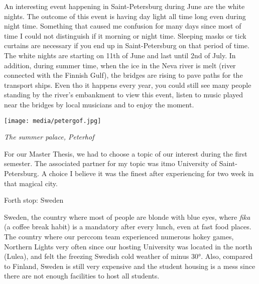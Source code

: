 \documentclass[10pt,a4paper]{article} %
\newcommand{\NewsItem}[1]{ %
\usefont{T1}{fvs}{n}{n} %
\vspace{24pt}\large #1\vspace{3pt} %
\par \normalsize \normalfont}
\begin{document}
\begin{multicols}{3}
 
An interesting event happening in Saint-Petersburg during June are the white nights.
The outcome of this event is having day light all time long even during night 
time. 
Something that caused me confusion for many days since most of time I could not 
distinguish if it morning or night time. 
Sleeping masks or tick curtains are necessary if you end up in Saint-Petersburg 
on that period of time. 
The white nights are starting on 11th of June and last until 2nd of July.
In addition, during summer time, when the ice in the Neva river is melt (river 
connected with the Finnish Gulf), the bridges are rising to pave paths for the 
transport ships. 
Even tho it happens every year, you could still see many people standing by the 
river's embankment to view this event, listen to music played near the bridges by 
local musicians and to enjoy the moment.
 
 
\begin{center}
	\texttt{[image: media/petergof.jpg]}
	\par\textit{The summer palace, Peterhof}
\end{center}


For our Master Thesis, we had to choose a topic of our interest during the first 
semester. 
The associated partner for my topic was {\sc itmo} University of Saint-Petersburg. 
A choice I believe it was the finest after experiencing for two week in that 
magical city.

\NewsItem{Forth stop: Sweden}

Sweden, the country where most of people are blonde with blue eyes, 
where \textit{fika} (a coffee break habit) is a mandatory after every lunch, 
even at fast food places. 
The country where our {\sc perccom} team experienced numerous hokey games, Northern 
Lights very often since our hosting University was located in the north (Lulea), and 
felt the freezing Swedish cold weather of minus \ang{30}. 
Also, compared to Finland, Sweden is still very expensive and the student housing is 
a mess since there are not enough facilities to host all students. 



\end{multicols}
\end{document}
